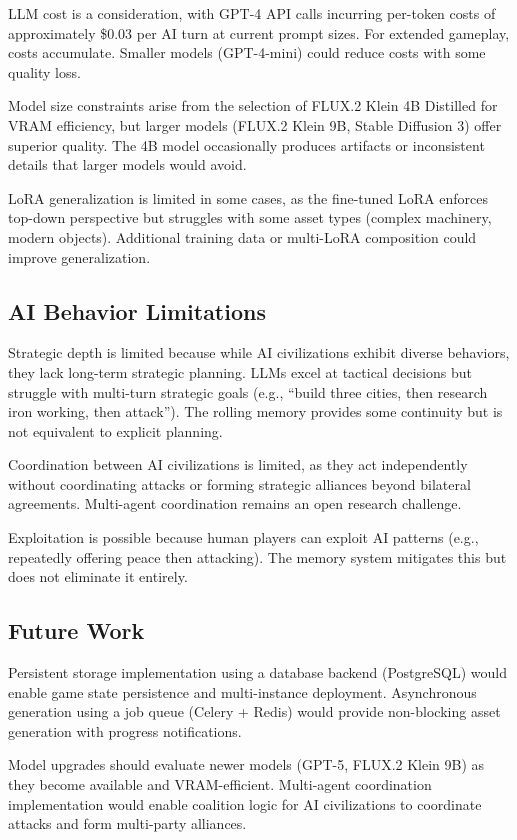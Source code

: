 \documentclass[conference]{IEEEtran}
\begin{document}
LLM cost is a consideration, with GPT-4 API calls incurring per-token costs of approximately \$0.03 per AI turn at current prompt sizes. For extended gameplay, costs accumulate. Smaller models (GPT-4-mini) could reduce costs with some quality loss.

Model size constraints arise from the selection of FLUX.2 Klein 4B Distilled for VRAM efficiency, but larger models (FLUX.2 Klein 9B, Stable Diffusion 3) offer superior quality. The 4B model occasionally produces artifacts or inconsistent details that larger models would avoid.

LoRA generalization is limited in some cases, as the fine-tuned LoRA enforces top-down perspective but struggles with some asset types (complex machinery, modern objects). Additional training data or multi-LoRA composition could improve generalization.

\subsection{AI Behavior Limitations}

Strategic depth is limited because while AI civilizations exhibit diverse behaviors, they lack long-term strategic planning. LLMs excel at tactical decisions but struggle with multi-turn strategic goals (e.g., ``build three cities, then research iron working, then attack''). The rolling memory provides some continuity but is not equivalent to explicit planning.

Coordination between AI civilizations is limited, as they act independently without coordinating attacks or forming strategic alliances beyond bilateral agreements. Multi-agent coordination remains an open research challenge.

Exploitation is possible because human players can exploit AI patterns (e.g., repeatedly offering peace then attacking). The memory system mitigates this but does not eliminate it entirely.

\subsection{Future Work}

Persistent storage implementation using a database backend (PostgreSQL) would enable game state persistence and multi-instance deployment. Asynchronous generation using a job queue (Celery + Redis) would provide non-blocking asset generation with progress notifications.

Model upgrades should evaluate newer models (GPT-5, FLUX.2 Klein 9B) as they become available and VRAM-efficient. Multi-agent coordination implementation would enable coalition logic for AI civilizations to coordinate attacks and form multi-party alliances.
\end{document}
